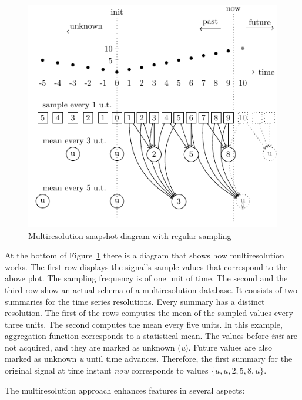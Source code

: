 \begin{figure}
  \centering
  \includegraphics{fig_mtsms_sequence.pdf}
  \caption{Multiresolution snapshot diagram with regular sampling}
  \label{fig:mtsms:sequence}
\end{figure}

At the bottom of Figure~\ref{fig:mtsms:sequence} there is a diagram
that shows how multiresolution works. The first row displays the
signal's sample values that correspond to the above plot. The sampling
frequency is of one unit of time. The second and the third row show an
actual schema of a multiresolution database. It consists of two
summaries for the time series resolutions. Every summary has a
distinct resolution. The first of the rows computes the mean of the
sampled values every three units. The second computes the mean every
five units. In this example, aggregation function corresponds to a
statistical mean. The values before \emph{init} are not acquired, and
they are marked as unknown (\emph{u}). Future values are also marked
as unknown \emph{u} until time advances. Therefore, the first summary
for the original signal at time instant \emph{now} corresponds to
values $\{u,u,2,5,8,u\}$.


The multiresolution approach enhances  features in several
aspects:

